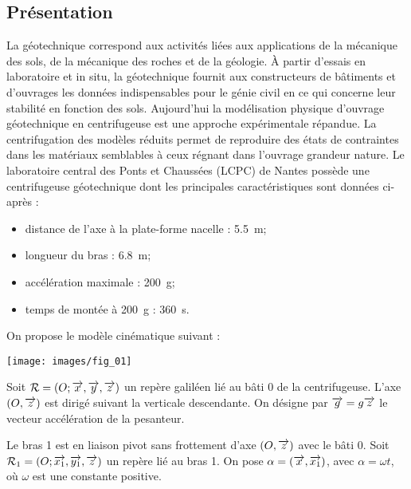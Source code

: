 \documentclass[10pt,fleqn]{article} %
\begin{document}
\def\pathfig{images}

\vspace{5cm}
\pagestyle{fancy}
\thispagestyle{plain}

\def\columnseprulecolor{\color{ocre}}
\setlength{\columnseprule}{0.4pt} 

\def\pathfig{images}

\ifprof
\else
\begin{multicols}{2}
\fi

\subsection*{Présentation}
La géotechnique correspond aux activités liées aux applications de la mécanique des sols, de la mécanique des roches et de la
géologie. À partir d'essais en laboratoire et in situ, la géotechnique fournit aux constructeurs de bâtiments et d'ouvrages les
données indispensables pour le génie civil en ce qui concerne leur stabilité en fonction des sols. Aujourd'hui la modélisation
physique d'ouvrage géotechnique en centrifugeuse est une approche expérimentale répandue. La centrifugation des modèles
réduits permet de reproduire des états de contraintes dans les matériaux semblables à ceux régnant dans l'ouvrage grandeur
nature. Le laboratoire central des Ponts et Chaussées (LCPC) de Nantes possède une centrifugeuse géotechnique dont les
principales caractéristiques sont données ci-après :
\begin{itemize}
\item distance de l'axe à la plate-forme nacelle : \SI{5,5}{m};
\item longueur du bras : \SI{6,8}{m};
\item accélération maximale : \SI{200}{g};
\item temps de montée à \SI{200}{g} : \SI{360}{s}.
\end{itemize}

On propose le modèle cinématique suivant :
\begin{center}
\texttt{[image: images/fig\_01]}
\end{center}

Soit $\mathcal{R}=\left(O;\overrightarrow{x},\overrightarrow{y},\overrightarrow{z} \right)$ un repère galiléen lié au bâti 0 de la centrifugeuse. L'axe $\left(O,\overrightarrow{z}\right)$ est dirigé suivant la verticale descendante. 
On désigne par $\overrightarrow{g}=g\overrightarrow{z}$ le vecteur accélération de la pesanteur.

Le bras 1 est en liaison pivot sans frottement d’axe $\left(O,\overrightarrow{z}\right)$ avec le bâti 0. Soit $\mathcal{R}_1=\left(O;\overrightarrow{x_1},\overrightarrow{y_1},\overrightarrow{z} \right)$ un repère lié au bras 1. On pose $\alpha=\left(\overrightarrow{x},\overrightarrow{x_1}\right)$, avec $\alpha=\omega t$, où $\omega$ est une constante positive. 


\end{multicols}
\end{document}
